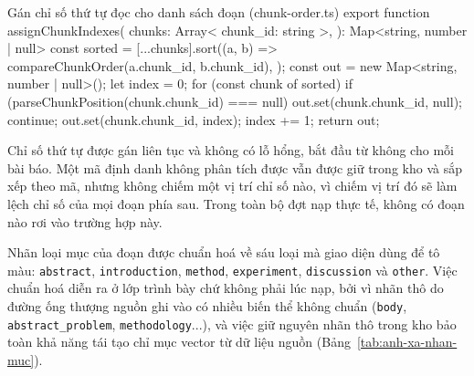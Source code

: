 \begin{tsbox}{Gán chỉ số thứ tự đọc cho danh sách đoạn (chunk-order.ts)}
export function assignChunkIndexes(
  chunks: Array<{ chunk_id: string }>,
): Map<string, number | null> {
  const sorted = [...chunks].sort((a, b) =>
    compareChunkOrder(a.chunk_id, b.chunk_id),
  );
  const out = new Map<string, number | null>();
  let index = 0;
  for (const chunk of sorted) {
    if (parseChunkPosition(chunk.chunk_id) === null) {
      out.set(chunk.chunk_id, null);
      continue;
    }
    out.set(chunk.chunk_id, index);
    index += 1;
  }
  return out;
}
\end{tsbox}

Chỉ số thứ tự được gán liên tục và không có lỗ hổng, bắt đầu từ không cho mỗi bài báo. Một mã định danh không phân tích được vẫn được giữ trong kho và sắp xếp theo mã, nhưng không chiếm một vị trí chỉ số nào, vì chiếm vị trí đó sẽ làm lệch chỉ số của mọi đoạn phía sau. Trong toàn bộ đợt nạp thực tế, không có đoạn nào rơi vào trường hợp này.

Nhãn loại mục của đoạn được chuẩn hoá về sáu loại mà giao diện dùng để tô màu: \texttt{abstract}, \texttt{introduction}, \texttt{method}, \texttt{experiment}, \texttt{discussion} và \texttt{other}. Việc chuẩn hoá diễn ra ở lớp trình bày chứ không phải lúc nạp, bởi vì nhãn thô do đường ống thượng nguồn ghi vào có nhiều biến thể không chuẩn (\texttt{body}, \texttt{abstract\_problem}, \texttt{methodology}...), và việc giữ nguyên nhãn thô trong kho bảo toàn khả năng tái tạo chỉ mục vector từ dữ liệu nguồn (Bảng~\ref{tab:anh-xa-nhan-muc}).

